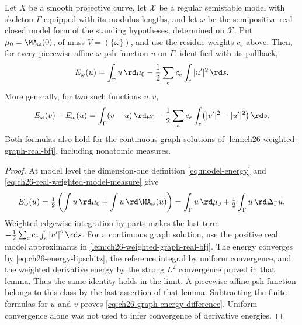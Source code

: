 \begin{proposition}
\label{prop:ch26-graph-energy}
Let \(X\) be a smooth projective curve, let \(\mathcal X\) be a regular
semistable model with skeleton \(\Gamma\) equipped with its modulus lengths,
and let \(\omega\) be the semipositive real closed model form of the
standing hypotheses, determined on \(\mathcal X\).  Put
\(\mu_0=\MA_\omega(0)\), of mass \(V=(\{\omega\})\), and use the
residue weights \(c_e\) above.  Then, for every piecewise affine
\(\omega\)-psh function \(u\) on \(\Gamma\), identified with its pullback,
\begin{equation}
\label{eq:ch26-graph-energy}
 E_\omega(u)=\int_\Gamma u\,\rd\mu_0
             -\frac12\sum_e c_e\int_e|u'|^2\,\rd s .
\end{equation}
More generally, for two such functions \(u,v\),
\begin{equation}
\label{eq:ch26-graph-energy-difference}
 E_\omega(v)-E_\omega(u)
 =\int_\Gamma(v-u)\,\rd\mu_0
  -\frac12\sum_e c_e\int_e\bigl(|v'|^2-|u'|^2\bigr)\,\rd s .
\end{equation}
Both formulas also hold for the continuous graph solutions of
\cref{lem:ch26-weighted-graph-real-bfj}, including nonatomic measures.
\end{proposition}

\begin{proof}
At model level the dimension-one definition \eqref{eq:model-energy} and
\eqref{eq:ch26-real-weighted-model-measure} give
\[
 E_\omega(u)=\tfrac12\left(\int u\,\rd\mu_0+
                          \int u\,\rd\MA_\omega(u)\right)
 =\int_\Gamma u\,\rd\mu_0+\tfrac12\int_\Gamma u\,\rd\Delta_\Gamma u.
\]
Weighted edgewise integration by parts makes the last term
\(-\tfrac12\sum_e c_e\int_e|u'|^2\,\rd s\).
For a continuous graph solution, use the positive real model
approximants in \cref{lem:ch26-weighted-graph-real-bfj}.
The energy converges by \eqref{eq:ch26-energy-lipschitz}, the reference
integral by uniform convergence, and the weighted derivative energy by
the strong \(L^2\) convergence proved in that lemma.  Thus the same
identity holds in the limit.  A piecewise affine psh function belongs
to this class by the last assertion of that lemma.  Subtracting the
finite formulas for \(u\) and \(v\) proves
\eqref{eq:ch26-graph-energy-difference}.  Uniform convergence alone was
not used to infer convergence of derivative energies.
\end{proof}

